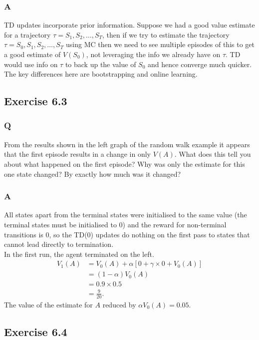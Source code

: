 \subsubsection{A}
TD updates incorporate prior information. Suppose we had a good value estimate for a trajectory $\tau = S_1, S_2, \dots, S_T$, then if we try to estimate the trajectory $\tau = S_0, S_1, S_2, \dots, S_T$ using MC then we need to see multiple episodes of this to get a good estimate of $V(S_0)$, not leveraging the info we already have on $\tau$. TD would use info on $\tau$ to back up the value of $S_0$ and hence converge much quicker. The key differences here are bootstrapping and online learning.

\subsection{Exercise 6.3}
\subsubsection{Q}
From the results shown in the left graph of the random walk example it appears that the first episode results in a change in only $V(A)$. What does this tell you about what happened on the first episode? Why was only the estimate for this one state changed? By exactly how much was it changed?

\subsubsection{A}
All states apart from the terminal states were initialised to the same value (the terminal states must be initialised to 0) and the reward for non-terminal transitions is 0, so the TD(0) updates do nothing on the first pass to states that cannot lead directly to termination. \\

In the first run, the agent terminated on the left.
\begin{align}
    V_1(A) &= V_0(A) + \alpha[ 0 + \gamma \times 0 + V_0(A)]\\
           &= (1-\alpha) V_0(A) \\
           &= 0.9 \times 0.5 \\
           &= \frac{9}{20}.
\end{align}    
The value of the estimate for $A$ reduced by $\alpha V_0(A) = 0.05$.

\subsection{Exercise 6.4}
